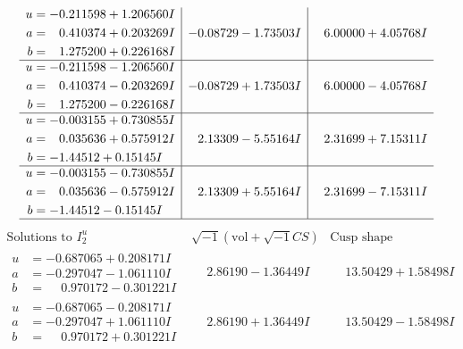 \documentclass[1p]{elsarticle_modified}
\theoremstyle{definition}
\newcommand{\I}{\sqrt{-1}}
\begin{document}
$$\begin{array}{c|c|c}
\begin{aligned}
u &= -0.211598 + 1.206560 I \\
a &= \phantom{-}0.410374 + 0.203269 I \\
b &= \phantom{-}1.275200 + 0.226168 I\end{aligned}
 & -0.08729 - 1.73503 I & \phantom{-}6.00000 + 4.05768 I \\ \hline\begin{aligned}
u &= -0.211598 - 1.206560 I \\
a &= \phantom{-}0.410374 - 0.203269 I \\
b &= \phantom{-}1.275200 - 0.226168 I\end{aligned}
 & -0.08729 + 1.73503 I & \phantom{-}6.00000 - 4.05768 I \\ \hline\begin{aligned}
u &= -0.003155 + 0.730855 I \\
a &= \phantom{-}0.035636 + 0.575912 I \\
b &= -1.44512 + 0.15145 I\end{aligned}
 & \phantom{-}2.13309 - 5.55164 I & \phantom{-}2.31699 + 7.15311 I \\ \hline\begin{aligned}
u &= -0.003155 - 0.730855 I \\
a &= \phantom{-}0.035636 - 0.575912 I \\
b &= -1.44512 - 0.15145 I\end{aligned}
 & \phantom{-}2.13309 + 5.55164 I & \phantom{-}2.31699 - 7.15311 I\\
 \hline 
 \end{array}$$\newpage$$\begin{array}{c|c|c}  
\text{Solutions to }I^u_{2}& \I (\text{vol} + \sqrt{-1}CS) & \text{Cusp shape}\\
 \hline 
\begin{aligned}
u &= -0.687065 + 0.208171 I \\
a &= -0.297047 - 1.061110 I \\
b &= \phantom{-}0.970172 - 0.301221 I\end{aligned}
 & \phantom{-}2.86190 - 1.36449 I & \phantom{-}13.50429 + 1.58498 I \\ \hline\begin{aligned}
u &= -0.687065 - 0.208171 I \\
a &= -0.297047 + 1.061110 I \\
b &= \phantom{-}0.970172 + 0.301221 I\end{aligned}
 & \phantom{-}2.86190 + 1.36449 I & \phantom{-}13.50429 - 1.58498 I \\ \hline\begin{aligned}

\end{aligned}
\end{array}$$
\end{document}
